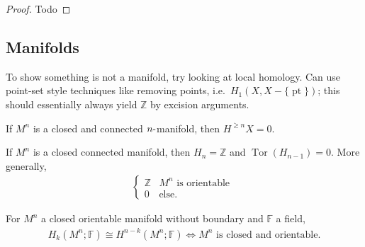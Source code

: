 \begin{proof}

Todo

\end{proof}


\hypertarget{manifolds}{%
\subsection{Manifolds}\label{manifolds}}

\begin{remark}

To show something is not a manifold, try looking at local homology. Can
use point-set style techniques like removing points,
i.e.~\(H_1(X, X-{\{\operatorname{pt}\}})\); this should essentially
always yield \({\mathbb{Z}}\) by excision arguments.

\end{remark}

\begin{proposition}

If \(M^n\) is a closed and connected \(n{\hbox{-}}\)manifold, then
\(H^{\geq n} X = 0\).

\end{proposition}

\begin{proposition}

If \(M^n\) is a closed connected manifold, then \(H_n = {\mathbb{Z}}\)
and \(\operatorname{Tor}(H_{n-1}) = 0\). More generally,
\begin{align*}
\begin{cases}
{\mathbb{Z}}& M^n \text{ is orientable } 
\\
0 & \text{else}.
\end{cases}
\end{align*}

\end{proposition}

\begin{proposition}

For \(M^n\) a closed orientable manifold without boundary and
\({\mathbb{F}}\) a field,
\begin{align*}
H_k(M^n; {\mathbb{F}}) \cong H^{n-k}(M^n; {\mathbb{F}})
\iff
M^n \text{ is closed and orientable}
.\end{align*}

\end{proposition}

